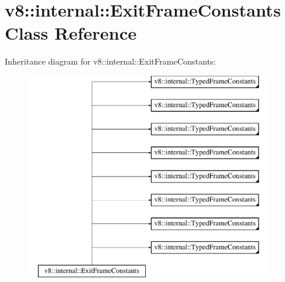 \hypertarget{classv8_1_1internal_1_1ExitFrameConstants}{}\section{v8\+:\+:internal\+:\+:Exit\+Frame\+Constants Class Reference}
\label{classv8_1_1internal_1_1ExitFrameConstants}
Inheritance diagram for v8\+:\+:internal\+:\+:Exit\+Frame\+Constants\+:\begin{figure}[H]
\begin{center}
\leavevmode
\includegraphics[height=9.000000cm]{classv8_1_1internal_1_1ExitFrameConstants}
\end{center}
\end{figure}
